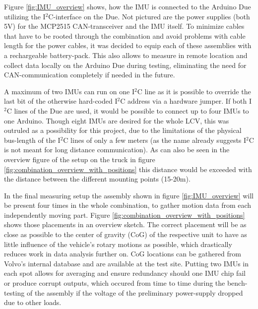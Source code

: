 \documentclass[ExampleMasters.tex]{subfiles}
\begin{document}
Figure \ref{fig:IMU_overview} shows, how the IMU is connected to the Arduino Due utilizing the I$^{2}$C-interface on the Due. Not pictured are the power supplies (both 5V) for the MCP2515 CAN-transceiver and the IMU itself. To minimize cables that have to be rooted through the combination and avoid problems with cable length for the power cables, it was decided to equip each of these assemblies with a rechargeable battery-pack. This also allows to measure in remote location and collect data locally on the Arduino Due during testing, eliminating the need for CAN-communication completely if needed in the future.

A maximum of two IMUs can run on one I$^{2}$C line as it is possible to override the last bit of the otherwise hard-coded I$^{2}$C address via a hardware jumper. If both I$^{2}$C lines of the Due are used, it would be possible to connect up to four IMUs to one Arduino. Though eight IMUs are desired for the whole LCV, this was outruled as a possibility for this project, due to the limitations of the physical bus-length of the I$^{2}$C lines of only a few meters (as the name already suggests I$^{2}$C is not meant for long distance communication). As can also be seen in the overview figure of the setup on the truck in figure \ref{fig:combination_overview_with_positions} this distance would be exceeded with the distance between the different mounting points (15-20m).

In the final measuring setup the assembly shown in figure \ref{fig:IMU_overview} will be present four times in the whole combination, to gather motion data from each independently moving part. Figure \ref{fig:combination_overview_with_positions} shows those placements in an overview sketch. The correct placement will be as close as possible to the center of gravity (CoG) of the respective unit to have as little influence of the vehicle's rotary motions as possible, which drastically reduces work in  data analysis further on. CoG locations can be gathered from Volvo's internal database and are available at the test site. Putting two IMUs in each spot allows for averaging and ensure redundancy should one IMU chip fail or produce corrupt outputs, which occured from time to time during the bench-testing of the assembly if the voltage of the preliminary power-supply dropped due to other loads.
\end{document}
